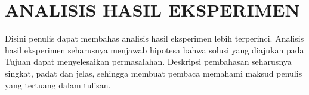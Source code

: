 \section{ANALISIS HASIL EKSPERIMEN}
Disini penulis dapat membahas analisis hasil eksperimen lebih terperinci. Analisis hasil eksperimen seharusnya menjawab hipotesa bahwa solusi yang diajukan pada Tujuan dapat menyelesaikan permasalahan. Deskripsi pembahasan seharusnya singkat, padat dan jelas, sehingga membuat pembaca memahami maksud penulis yang tertuang dalam tulisan. 
